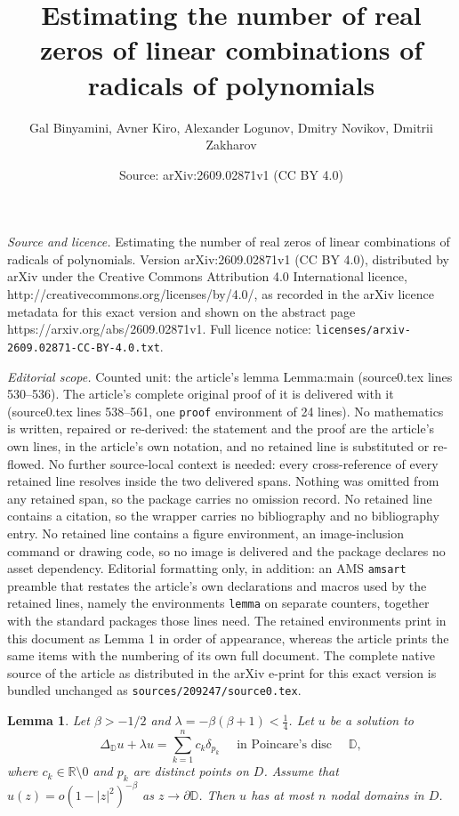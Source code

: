 \documentclass[10pt,a4paper]{amsart}
\title{Estimating the number of real zeros of linear combinations of radicals of polynomials}
\author{Gal Binyamini, Avner Kiro, Alexander Logunov, Dmitry Novikov, Dmitrii Zakharov}
\date{Source: arXiv:2609.02871v1 (CC BY 4.0)}
\newtheorem{lemma}{Lemma}
\begin{document}
\maketitle

\noindent\emph{Source and licence.} Estimating the number of real zeros of linear combinations of radicals of polynomials. Version arXiv:2609.02871v1 (CC BY 4.0), distributed by arXiv under the Creative Commons Attribution 4.0 International licence, http://creativecommons.org/licenses/by/4.0/, as recorded in the arXiv licence metadata for this exact version and shown on the abstract page https://arxiv.org/abs/2609.02871v1. Full licence notice: \texttt{licenses/arxiv-2609.02871-CC-BY-4.0.txt}.\par\smallskip

\noindent\textit{Editorial scope.} Counted unit: the article's lemma Lemma:main (source0.tex lines 530--536). The article's complete original proof of it is delivered with it (source0.tex lines 538--561, one \texttt{proof} environment of 24 lines). No mathematics is written, repaired or re-derived: the statement and the proof are the article's own lines, in the article's own notation, and no retained line is substituted or re-flowed.  No further source-local context is needed: every cross-reference of every retained line resolves inside the two delivered spans.  Nothing was omitted from any retained span, so the package carries no omission record.  No retained line contains a citation, so the wrapper carries no bibliography and no bibliography entry.  No retained line contains a figure environment, an image-inclusion command or drawing code, so no image is delivered and the package declares no asset dependency.  Editorial formatting only, in addition: an AMS \texttt{amsart} preamble that restates the article's own declarations and macros used by the retained lines, namely the environments \texttt{lemma} on separate counters, together with the standard packages those lines need.  The retained environments print in this document as Lemma 1 in order of appearance, whereas the article prints the same items with the numbering of its own full document.  The complete native source of the article as distributed in the arXiv e-print for this exact version is bundled unchanged as \texttt{sources/209247/source0.tex}.
\begin{lemma} \label{Lemma:main}
Let $\beta>-1/2$ and $\lambda=-\beta(\beta+1)< \frac{1}{4}$. Let $u$ be a solution to
\[
\Delta_{\mathbb{D}} u + \lambda u=\sum_{k=1}^{n}c_{k}\delta_{p_{k}} \quad \text{ in Poincare's disc } \quad \mathbb{D},
\]
where $c_{k} \in \mathbb{R}\setminus{0}$ and $p_k$ are distinct points on $D$. Assume that $u(z) = o(1-|z|^2)^{-\beta}$ as $z \to \partial \mathbb{D}$. Then $u$ has at most $n$ nodal domains in $D$.
\end{lemma}
\end{document}
